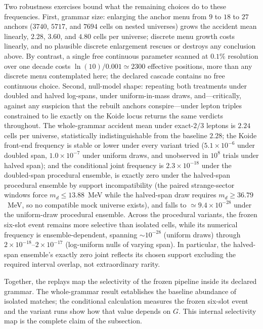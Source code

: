 \documentclass[aps,twocolumn,superscriptaddress,nofootinbib,floatfix]{revtex4-2}
\begin{document}
Two robustness exercises bound what the remaining choices do to these
frequencies. First, grammar size: enlarging the anchor menu from $9$ to $18$
to $27$ anchors ($3740$, $5717$, and $7694$ cells on nested universes) grows
the accident mean linearly, $2.28$, $3.60$, and $4.80$ cells per universe;
discrete menu growth costs linearly, and no plausible discrete enlargement
rescues or destroys any conclusion above. By contrast, a single free
continuous parameter scanned at $0.1\%$ resolution over one decade costs
$\ln(10)/0.001\simeq2300$ effective positions, more than any discrete menu
contemplated here; the declared cascade contains no free continuous choice.
Second, null-model shape: repeating both treatments under doubled and halved
log-spans, under uniform-in-mass draws, and---critically, against any
suspicion that the rebuilt anchors conspire---under lepton triples
constrained to lie exactly on the Koide locus returns the same verdicts
throughout. The whole-grammar accident mean under exact-$2/3$ leptons is
$2.24$ cells per universe, statistically indistinguishable from the baseline
$2.28$; the Koide front-end frequency is stable or
lower under every variant tried ($5.1\times10^{-6}$ under doubled span,
$1.0\times10^{-7}$ under uniform draws, and unobserved in $10^8$ trials
under halved span); and the conditional joint frequency is
$2.3\times10^{-18}$ under the doubled-span procedural ensemble, is exactly zero
under the halved-span procedural ensemble by support incompatibility (the paired strange-sector windows force
$m_d\le13.88$~MeV while the halved-span draw requires $m_d\ge36.79$~MeV, so no compatible mock universe exists),
and falls to $\simeq9.4\times10^{-28}$ under the uniform-draw procedural ensemble. Across the procedural variants, the frozen six-slot event remains more selective than isolated cells, while its numerical frequency is ensemble-dependent,
spanning $\sim10^{-28}$ (uniform draws) through
$2\times10^{-18}$--$2\times10^{-17}$ (log-uniform nulls of varying
span). In particular, the halved-span ensemble's exactly zero joint reflects
its chosen support excluding the required interval overlap, not
extraordinary rarity.

Together, the replays map the selectivity of the frozen pipeline inside its declared grammar. The whole-grammar result establishes the baseline abundance of isolated matches; the conditional calculation measures the frozen six-slot event and the variant runs show how that value depends on $G$. This internal selectivity map is the complete claim of the subsection.
\end{document}
